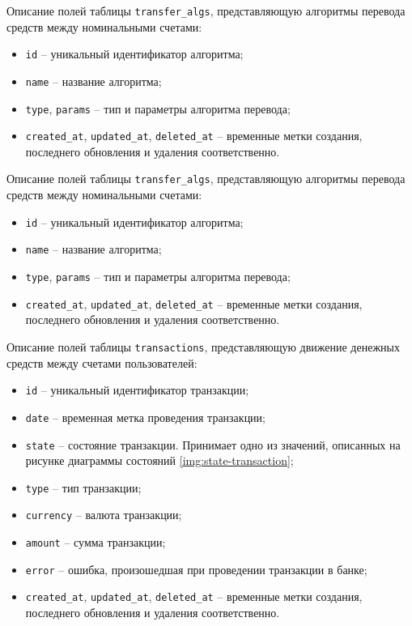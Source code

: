 Описание полей таблицы \texttt{transfer\_algs}, представляющую алгоритмы перевода средств между номинальными счетами:
\begin{itemize}
    \item \texttt{id} -- уникальный идентификатор алгоритма;
    \item \texttt{name} -- название алгоритма;
    \item \texttt{type}, \texttt{params} -- тип и параметры алгоритма перевода;
    \item \texttt{created\_at}, \texttt{updated\_at}, \texttt{deleted\_at} -- временные метки создания, последнего обновления и удаления соответственно.
\end{itemize}

Описание полей таблицы \texttt{transfer\_algs}, представляющую алгоритмы перевода средств между номинальными счетами:
\begin{itemize}
    \item \texttt{id} -- уникальный идентификатор алгоритма;
    \item \texttt{name} -- название алгоритма;
    \item \texttt{type}, \texttt{params} -- тип и параметры алгоритма перевода;
    \item \texttt{created\_at}, \texttt{updated\_at}, \texttt{deleted\_at} -- временные метки создания, последнего обновления и удаления соответственно.
\end{itemize}

Описание полей таблицы \texttt{transactions}, представляющую движение денежных средств между счетами пользователей:
\begin{itemize}
    \item \texttt{id} -- уникальный идентификатор транзакции;
    \item \texttt{date} -- временная метка проведения транзакции;
    \item \texttt{state} -- состояние транзакции. Принимает одно из значений, описанных на рисунке диаграммы состояний \ref{img:state-transaction};
    \item \texttt{type} -- тип транзакции;
    \item \texttt{currency} -- валюта транзакции;
    \item \texttt{amount} -- сумма транзакции;
    \item \texttt{error} -- ошибка, произошедшая при проведении транзакции в банке;
    \item \texttt{created\_at}, \texttt{updated\_at}, \texttt{deleted\_at} -- временные метки создания, последнего обновления и удаления соответственно.
\end{itemize}

